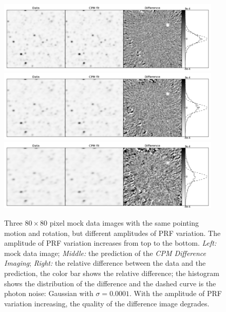 \documentclass[12pt, preprint]{aastex}
\newcommand{\project}[1]{\textsl{#1}}
\newcommand{\cpmdiff}{\project{CPM Difference Imaging}}
\begin{document}
\begin{figure}[p]
\begin{center}
\includegraphics[width=0.95\textwidth]{f9a}
\includegraphics[width=0.95\textwidth]{f9b}
\includegraphics[width=0.95\textwidth]{f9c}
\end{center}
\caption{
  \label{large_prf}
  Three $80\times 80$ pixel mock data images with the same pointing motion and rotation, but different amplitudes of PRF variation. The amplitude of PRF variation increases from top to the bottom.
  \emph{Left:} mock data image;
  \emph{Middle:} the prediction of the \cpmdiff;
  \emph{Right:} the relative difference between the data and the prediction, the color bar shows the relative difference; the histogram shows the distribution of the difference and the dashed curve is the photon noise: Gaussian with $\sigma = 0.0001$. 
  With the amplitude of PRF variation increasing, the quality of the difference image degrades.
}
\end{figure}
\end{document}
